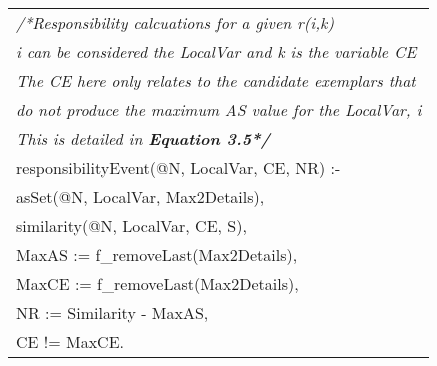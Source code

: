 \documentclass[letterpaper,twocolumn,11pt]{article}
\begin{document}
\begin{tabular}{|l|}
\scriptsize{\textit{/*Responsibility calcuations for a given r(i,k)}}\\
\scriptsize{\textit{i can be considered the LocalVar and k is the variable CE}}\\
\scriptsize{\textit{The CE here only relates to the candidate exemplars that}}\\
\scriptsize{\textit{do not produce the maximum AS value for the LocalVar, i}}\\
\scriptsize{\textit{This is detailed in \textbf{Equation 3.5*/}}}\\
\scriptsize{responsibilityEvent(@N, LocalVar, CE, NR) :-}\\
\scriptsize{ \hspace{0.5cm}        asSet(@N, LocalVar, Max2Details),}\\
\scriptsize{ \hspace{0.5cm}        similarity(@N, LocalVar, CE, S), }\\
\scriptsize{ \hspace{0.5cm}        MaxAS := f\_removeLast(Max2Details),}\\
\scriptsize{ \hspace{0.5cm}        MaxCE := f\_removeLast(Max2Details),}\\
\scriptsize{ \hspace{0.5cm}        NR := Similarity - MaxAS,}\\
\scriptsize{ \hspace{0.5cm}        CE != MaxCE.}\\


\end{tabular}
\end{document}
